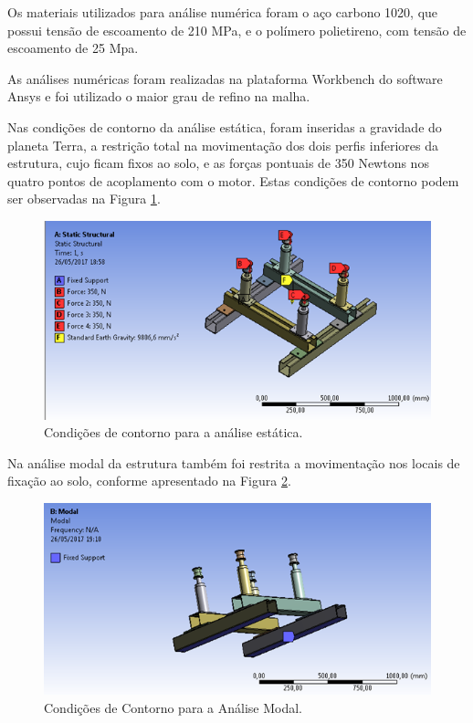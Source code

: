 \pagebreak

Os materiais utilizados para análise numérica foram o aço carbono 1020, que possui tensão de escoamento de 210 MPa, e o polímero polietireno, com tensão de escoamento de 25 Mpa.

As análises numéricas foram realizadas na plataforma Workbench do software Ansys e foi utilizado o maior grau de refino na malha.

Nas condições de contorno da análise estática, foram inseridas a gravidade do planeta Terra, a restrição total na movimentação dos dois perfis inferiores da estrutura, cujo ficam fixos ao solo, e as forças pontuais de 350 Newtons nos quatro pontos de acoplamento com o motor. Estas condições de contorno podem ser observadas na Figura \ref{fig:analiseestatica}.

\begin{figure}[h!]
	\centering
	\includegraphics[keepaspectratio=true,scale= 0.8]{figuras/analise-estatica.png}
	\caption{Condições de contorno para a análise estática.}
	\label{fig:analiseestatica}
\end{figure}

Na análise modal da estrutura também foi restrita a movimentação nos locais de fixação ao solo, conforme apresentado na Figura \ref{fig:analisemodal}.

\begin{figure}[h!]
	\centering
	\includegraphics[keepaspectratio=true,scale= 0.8]{figuras/analise-modal.png}
	\caption{Condições de Contorno para a Análise Modal.}
	\label{fig:analisemodal}
\end{figure}


